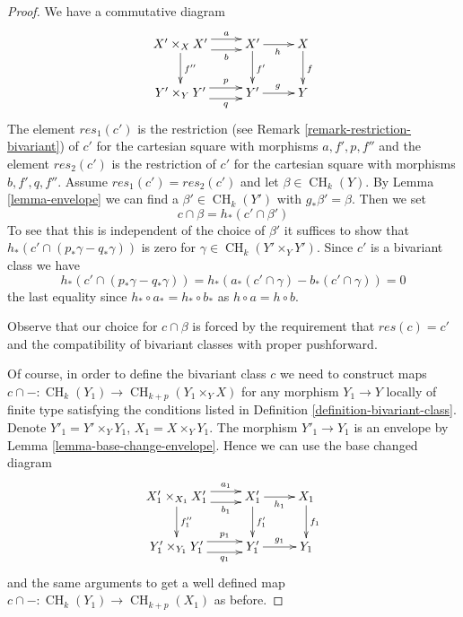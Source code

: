 \documentclass[10pt,a4paper]{amsart}
\theoremstyle{plain}
\theoremstyle{definition}
\theoremstyle{remark}
\numberwithin{equation}{subsection}
\def\CH{\mathop{\mathrm{CH}}\nolimits}
\begin{document}
\begin{proof}
We have a commutative diagram
$$
\xymatrix{
X' \times_X X' \ar[d]^{f''} \ar@<1ex>[r]^-a \ar@<-1ex>[r]_-b &
X' \ar[d]^{f'} \ar[r]_h &
X \ar[d]^f \\
Y' \times_Y Y' \ar@<1ex>[r]^-p \ar@<-1ex>[r]_-q &
Y' \ar[r]^g &
Y
}
$$
The element $res_1(c')$ is the restriction (see
Remark \ref{remark-restriction-bivariant}) of $c'$ for the cartesian square
with morphisms $a, f', p, f''$ and the element $res_2(c')$ is the restriction
of $c'$ for the cartesian square with morphisms $b, f', q, f''$.
Assume $res_1(c') = res_2(c')$ and let $\beta \in \CH_k(Y)$.
By Lemma \ref{lemma-envelope} we can find a $\beta' \in \CH_k(Y')$
with $g_*\beta' = \beta$. Then we set
$$
c \cap \beta = h_*(c' \cap \beta')
$$
To see that this is independent of the choice of
$\beta'$ it suffices to show that
$h_*(c' \cap (p_*\gamma - q_*\gamma))$ is zero
for $\gamma \in \CH_k(Y' \times_Y Y')$.
Since $c'$ is a bivariant class we have
$$
h_*(c' \cap (p_*\gamma - q_*\gamma)) =
h_*(a_*(c' \cap \gamma) - b_*(c' \cap \gamma)) = 0
$$
the last equality since $h_* \circ a_* = h_* \circ b_*$
as $h \circ a = h \circ b$.

\medskip\noindent
Observe that our choice for $c \cap \beta$ is forced
by the requirement that $res(c) = c'$ and the compatibility
of bivariant classes with proper pushforward.

\medskip\noindent
Of course, in order to define the bivariant class $c$ we need
to construct maps $c \cap -: \CH_k(Y_1) \to \CH_{k + p}(Y_1 \times_Y X)$
for any morphism $Y_1 \to Y$ locally of finite type satisfying the
conditions listed in Definition \ref{definition-bivariant-class}.
Denote $Y'_1 = Y' \times_Y Y_1$, $X_1 = X \times_Y Y_1$.
The morphism $Y'_1 \to Y_1$ is an envelope by
Lemma \ref{lemma-base-change-envelope}. Hence we can use the base
changed diagram
$$
\xymatrix{
X'_1 \times_{X_1} X'_1 \ar[d]^{f''_1} \ar@<1ex>[r]^-{a_1} \ar@<-1ex>[r]_-{b_1} &
X'_1 \ar[d]^{f'_1} \ar[r]_{h_1} &
X_1 \ar[d]^{f_1} \\
Y'_1 \times_{Y_1} Y'_1 \ar@<1ex>[r]^-{p_1} \ar@<-1ex>[r]_-{q_1} &
Y'_1 \ar[r]^{g_1} &
Y_1
}
$$
and the same arguments to get a well defined map
$c \cap - : \CH_k(Y_1) \to \CH_{k + p}(X_1)$ as before.


\end{proof}
\end{document}
